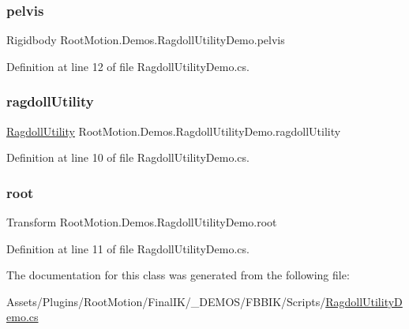 \subsubsection{\texorpdfstring{pelvis}{pelvis}}
{\footnotesize\ttfamily Rigidbody Root\+Motion.\+Demos.\+Ragdoll\+Utility\+Demo.\+pelvis}



Definition at line 12 of file Ragdoll\+Utility\+Demo.\+cs.

\mbox{\label{class_root_motion_1_1_demos_1_1_ragdoll_utility_demo_a31dd4befe46bbc31a0ef04adb33eb70a}} 
\subsubsection{\texorpdfstring{ragdoll\+Utility}{ragdollUtility}}
{\footnotesize\ttfamily \mbox{\hyperlink{class_root_motion_1_1_final_i_k_1_1_ragdoll_utility}{Ragdoll\+Utility}} Root\+Motion.\+Demos.\+Ragdoll\+Utility\+Demo.\+ragdoll\+Utility}



Definition at line 10 of file Ragdoll\+Utility\+Demo.\+cs.

\mbox{\label{class_root_motion_1_1_demos_1_1_ragdoll_utility_demo_a20bf8cbf48c66215defc0c93d6c8ddbc}} 
\subsubsection{\texorpdfstring{root}{root}}
{\footnotesize\ttfamily Transform Root\+Motion.\+Demos.\+Ragdoll\+Utility\+Demo.\+root}



Definition at line 11 of file Ragdoll\+Utility\+Demo.\+cs.



The documentation for this class was generated from the following file\+:\begin{DoxyCompactItemize}
\item 
Assets/\+Plugins/\+Root\+Motion/\+Final\+I\+K/\+\_\+\+D\+E\+M\+O\+S/\+F\+B\+B\+I\+K/\+Scripts/\mbox{\hyperlink{_ragdoll_utility_demo_8cs}{Ragdoll\+Utility\+Demo.\+cs}}\end{DoxyCompactItemize}
